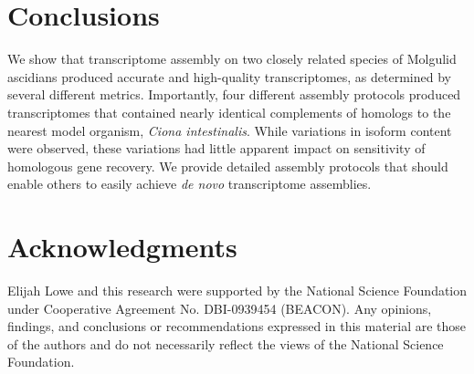 \documentclass[fleqn,10pt]{wlpeerj}
\begin{document}
\section{Conclusions}
We show that transcriptome assembly on two closely related species of Molgulid ascidians produced accurate and high-quality transcriptomes, as determined by several different metrics.  Importantly, four different assembly protocols produced transcriptomes that contained nearly identical complements of homologs to the nearest model organism, \textit{Ciona intestinalis}.  While variations in isoform content were observed, these variations had little apparent impact on sensitivity of homologous gene recovery. We provide detailed assembly protocols that should enable others to easily achieve \textit{de novo} transcriptome assemblies.

\section*{Acknowledgments}

Elijah Lowe and this research were supported by the National Science Foundation under Cooperative Agreement No. DBI-0939454 (BEACON). Any opinions, findings, and conclusions or recommendations expressed in this material are those of the authors and do not necessarily reflect the views of the National Science Foundation.


\end{document}
